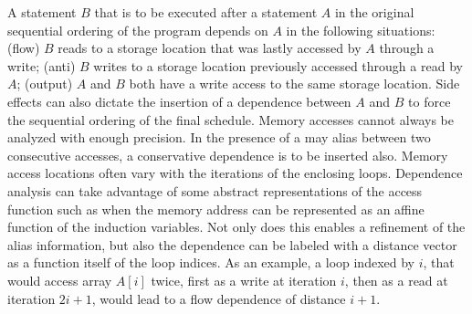A statement $B$ that is to be executed after a statement $A$ in the original sequential ordering of the program depends on $A$ in the following situations: 
(flow) $B$ reads to a storage location that was lastly accessed by $A$ through a write; 
(anti) $B$ writes to a storage location previously accessed through a read by $A$; 
(output) $A$ and $B$ both have a write access to the same storage location. 
Side effects can also dictate the insertion of a dependence between $A$ and $B$ to force the sequential ordering of the final schedule. 
Memory accesses cannot always be analyzed with enough precision. 
In the presence of a may alias between two consecutive accesses, a conservative dependence is to be inserted also. 
Memory access locations often vary with the iterations of the enclosing loops. 
Dependence analysis can take advantage of some abstract representations of the access function such as when the memory address can be represented as an affine function of the induction variables. 
Not only does this enables a refinement of the alias information, but also the dependence can be labeled with a distance vector as a function itself of the loop indices. 
As an example, a loop indexed by $i$, that would access array $A[i]$ twice, first as a write at iteration $i$, then as a read at iteration $2i+1$, would lead to a flow dependence of distance $i+1$.

